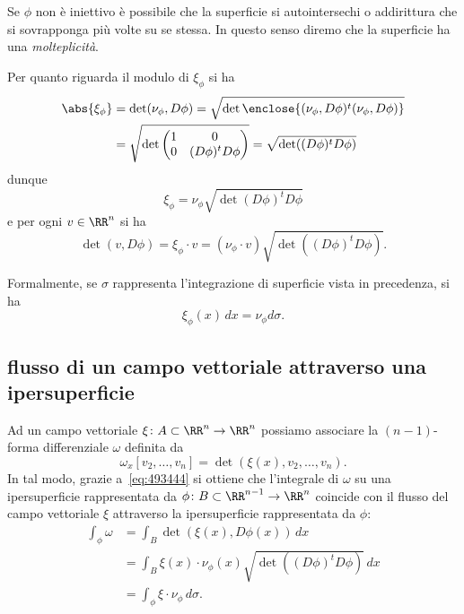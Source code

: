 Se $\phi$ non è iniettivo è possibile che la superficie si autointersechi 
o addirittura che si sovrapponga più volte su se stessa. 
In questo senso diremo che la superficie ha una \emph{molteplicità}.

Per quanto riguarda il modulo di $\xi_\phi$ si ha 
\begin{align*}
   \abs{\xi_\phi} &= \det (\nu_\phi, D\phi)
   = \sqrt{\det \enclose{(\nu_\phi, D\phi)^t (\nu_\phi,D\phi)}}  \\
   &= \sqrt{\det \begin{pmatrix}
     1 & 0 \\
     0 & (D\phi)^t D\phi
   \end{pmatrix}}
  = \sqrt{\det((D\phi)^t D\phi)}
\end{align*}
dunque 
\[
  \xi_\phi = \nu_\phi \sqrt{\det (D\phi)^t D\phi}
\]
e per ogni $v\in \RR^n$ si ha
\begin{equation}\label{eq:493444}
\det(v, D\phi)
= \xi_\phi \cdot v
= (\nu_\phi \cdot v) \sqrt{\det((D\phi)^t D\phi)}.
\end{equation}

Formalmente, se $\sigma$ rappresenta l'integrazione di superficie vista in precedenza, 
si ha
\[
  \xi_\phi(x) \, dx = \nu_\phi d\sigma.
\]


\subsection{flusso di un campo vettoriale attraverso una ipersuperficie}

Ad un campo vettoriale $\xi\colon A\subset \RR^n\to \RR^n$ possiamo associare la 
$(n-1)$-forma differenziale $\omega$ definita da
\[
  \omega_x[v_2,\dots,v_n] = \det(\xi(x), v_2,\dots,v_n).
\]
In tal modo, grazie a~\eqref{eq:493444} si ottiene che 
l'integrale di $\omega$ su una ipersuperficie rappresentata da $\phi\colon B\subset \RR^{n-1} \to \RR^n$
coincide con il flusso del campo vettoriale $\xi$ attraverso la ipersuperficie rappresentata da $\phi$: 
\begin{align*}
  \int_\phi \omega
  &= \int_B \det (\xi(x), D\phi(x))\, dx \\
  &= \int_B \xi(x) \cdot \nu_\phi(x) \sqrt{\det((D\phi)^t D\phi)}\, dx \\
  &= \int_\phi \xi \cdot \nu_\phi\, d\sigma.
\end{align*}
